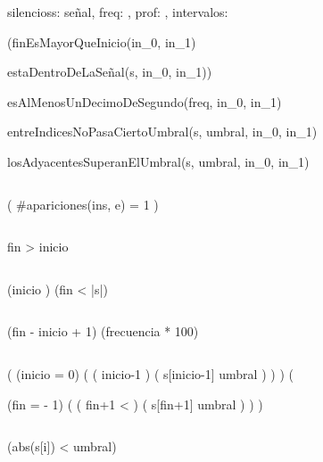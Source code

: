 
\begin{proc}{silencios}{\In s: señal,
    \In freq: \ent,
    \In prof: \ent,
    \Out intervalos: }{}
\end{proc}

{

    \quad (finEsMayorQueInicio(in_{0}, in_{1}) \wedge

    \quad\quad estaDentroDeLaSeñal(s, in_{0}, in_{1})) \yLuego

    \quad\quad esAlMenosUnDecimoDeSegundo(freq, in_{0}, in_{1}) \wedge

    \quad\quad entreIndicesNoPasaCiertoUmbral(s, umbral, in_{0}, in_{1}) \wedge

    \quad\quad losAdyacentesSuperanElUmbral(s, umbral, in_{0}, in_{1})

}

$ $

{
    \implicaLuego (
        \#apariciones(ins, e) = 1
    )
}

$ $

{
    fin > inicio
}

$ $

{
    (inicio ) \wedge (fin < |s|)
}

$ $

{
    (fin - inicio + 1) \geq (frecuencia * 100)
}

$ $

{

    \quad(
        (inicio = 0) \vee (
            (
                inicio-1  
            ) \yLuego (
                s[inicio-1] \geq umbral
            )
        )
    ) \wedge (

        \quad\quad(fin =  - 1) \vee (
            (
                fin+1 < 
            ) \yLuego (
                s[fin+1] \geq umbral
            )
        )
    )

}

$ $

{

    \quad{}
    \implicaLuego
    (abs(s[i]) < umbral)

}
